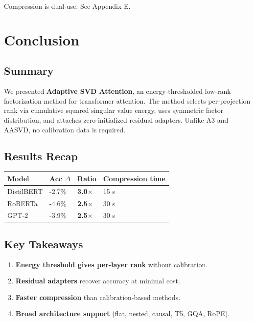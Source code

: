 Compression is dual-use. See Appendix E.


\section{Conclusion}

\subsection{Summary}

We presented \textbf{Adaptive SVD Attention}, an energy-thresholded low-rank 
factorization method for transformer attention. The method selects per-projection 
rank via cumulative squared singular value energy, uses symmetric factor 
distribution, and attaches zero-initialized residual adapters. Unlike A3 and 
AASVD, no calibration data is required.

\subsection{Results Recap}

\begin{table}[H]
\centering
\small
\begin{tabular}{llll}
\toprule
\textbf{Model} & \textbf{Acc $\Delta$} & \textbf{Ratio} & \textbf{Compression time} \\
\midrule
DistilBERT & -2.7\% & \textbf{3.0$\times$} & 15 s \\
RoBERTa & -4.6\% & \textbf{2.5$\times$} & 30 s \\
GPT-2 & -3.9\% & \textbf{2.5$\times$} & 30 s \\
\bottomrule
\end{tabular}
\end{table}

\subsection{Key Takeaways}

\begin{enumerate}
\item \textbf{Energy threshold gives per-layer rank} without calibration.
\item \textbf{Residual adapters} recover accuracy at minimal cost.
\item \textbf{Faster compression} than calibration-based methods.
\item \textbf{Broad architecture support} (flat, nested, causal, T5, GQA, RoPE).

\end{enumerate}
